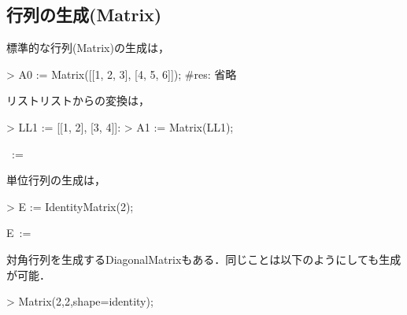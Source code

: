 \subsection{行列の生成(Matrix)}
標準的な行列(Matrix)の生成は，
\begin{MapleInput}
> A0 := Matrix([[1, 2, 3], [4, 5, 6]]); #res: 省略
\end{MapleInput}
リストリストからの変換は，
\begin{MapleInput}
> LL1 := [[1, 2], [3, 4]]:
> A1 := Matrix(LL1);
\end{MapleInput}
\begin{MapleOutput}
\, := \, \left[ \begin {array}{cc} 1&2\\ 3&4\end {array} \right] 
\end{MapleOutput}
単位行列の生成は，
\begin{MapleInput}
> E := IdentityMatrix(2);
\end{MapleInput}
\begin{MapleOutput}
\displaystyle E\, := \, \left[ \begin {array}{cc} 1&0\\ 0&1\end {array} \right]
\end{MapleOutput}
対角行列を生成するDiagonalMatrixもある．同じことは以下のようにしても生成が可能．
\begin{MapleInput}
> Matrix(2,2,shape=identity);
\end{MapleInput}
\begin{MapleOutput}
\displaystyle  \left[ \begin {array}{cc} 1&0\\ 0&1\end {array} \right] 
\end{MapleOutput}

